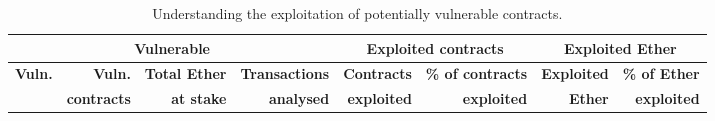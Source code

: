 \begin{table}[tb]
	\centering
	\caption{Understanding the exploitation of potentially vulnerable contracts.}
	\label{fig:findings-summary}
	\small
	\setlength{\tabcolsep}{1pt}
	\begin{tabular}{|lrrr||rr||rr|}
		\hline

		\multicolumn{4}{|c||}{\bf Vulnerable} & \multicolumn{2}{c||}{\bf Exploited contracts} &
		\multicolumn{2}{c|}{\bf Exploited Ether}                                                                                                                                                                                                      \\ \hline
		\bf Vuln.                             & \bf Vuln.                                     & \bf Total Ether & \bf Transactions         & \bf Contracts          & \bf \% of contracts        & \bf Exploited   & \bf \% of Ether \bigstrut[t]     \\
		                                      & \bf contracts                                 & \bf at stake    & \bf analysed             & \bf exploited          & \bf exploited              & \bf Ether       & \bf exploited                    \\


\end{tabular}
\end{table}
